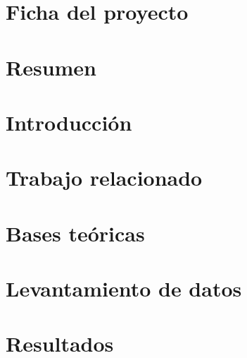 \documentclass[12pt, letterpaper, oneside]{report}
\begin{document}


\pagestyle{plain}

\tableofcontents
\clearpage
\listoffigures
{}
\clearpage
\listoftables
{}
\clearpage

\chapter*{Ficha del proyecto}

\clearpage

\chapter*{Resumen}

\clearpage

\pagestyle{principal}

\chapter{Introducción}\label{cap:intro}


\chapter{Trabajo relacionado}\label{cap:relacionado}


\chapter{Bases teóricas}\label{cap:teoria}


\chapter{Levantamiento de datos}\label{cap:datos}


\chapter{Resultados}\label{cap:resultados}

\end{document}
